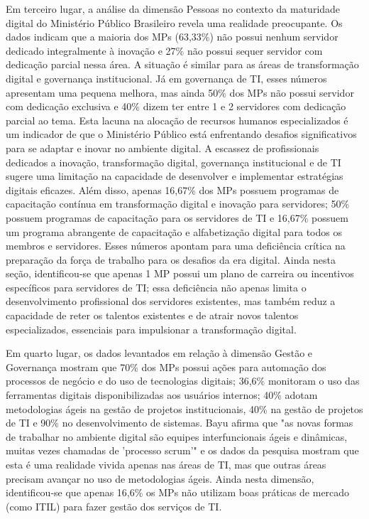 Em terceiro lugar, a análise da dimensão Pessoas no contexto da maturidade digital do Ministério Público Brasileiro revela uma realidade preocupante. Os dados indicam que a maioria dos MPs (63,33\%) não possui nenhum servidor dedicado integralmente à inovação e 27\% não possui sequer servidor com dedicação parcial nessa área. A situação é similar para as áreas de transformação digital e governança institucional. Já em governança de TI, esses números apresentam uma pequena melhora, mas ainda 50\% dos MPs não possui servidor com dedicação exclusiva e 40\% dizem ter entre 1 e 2 servidores com dedicação parcial ao tema. Esta lacuna na alocação de recursos humanos especializados é um indicador de que o Ministério Público está enfrentando desafios significativos para se adaptar e inovar no ambiente digital. A escassez de profissionais dedicados a inovação, transformação digital, governança institucional e de TI sugere uma limitação na capacidade de desenvolver e implementar estratégias digitais eficazes. Além disso, apenas 16,67\% dos MPs possuem programas de capacitação contínua em transformação digital e inovação para servidores; 50\% possuem programas de capacitação para os servidores de TI e 16,67\% possuem um programa abrangente de capacitação e alfabetização digital para todos os membros e servidores. Esses números apontam para uma deficiência crítica na preparação da força de trabalho para os desafios da era digital. Ainda nesta seção, identificou-se que apenas 1 MP possui um plano de carreira ou incentivos específicos para servidores de TI; essa deficiência não apenas limita o desenvolvimento profissional dos servidores existentes, mas também reduz a capacidade de reter os talentos existentes e de atrair novos talentos especializados, essenciais para impulsionar a transformação digital.

Em quarto lugar, os dados levantados em relação à dimensão Gestão e Governança mostram que 70\% dos MPs possui ações para automação dos processos de negócio e do uso de tecnologias digitais; 36,6\% monitoram o uso das ferramentas digitais disponibilizadas aos usuários internos; 40\% adotam metodologias ágeis na gestão de projetos institucionais, 40\% na gestão de projetos de TI e 90\% no desenvolvimento de sistemas. Bayu \cite{Hie_2019} afirma que "as novas formas de trabalhar no ambiente digital são equipes interfuncionais ágeis e dinâmicas, muitas vezes chamadas de 'processo scrum'" e os dados da pesquisa mostram que esta é uma realidade vivida apenas nas áreas de TI, mas que outras áreas precisam avançar no uso de metodologias ágeis. Ainda nesta dimensão, identificou-se que apenas 16,6\% os MPs não utilizam boas práticas de mercado (como ITIL) para fazer gestão dos serviços de TI.

